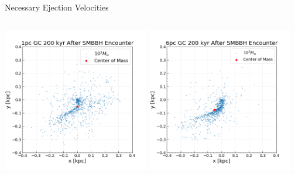 \documentclass[aspectratio=169]{beamer}
\begin{document}
\begin{frame}
  {Necessary Ejection Velocities}
  \begin{columns}
    \includegraphics[width=6.4cm, height=6.4cm]{./Images/1pc200kyr_scatter.png}
    \centering
    \includegraphics[width=6.4cm, height=6.4cm]{./Images/6pc200kyr_scatter.png}
    \centering
  \end{columns}
\end{frame}
\end{document}
